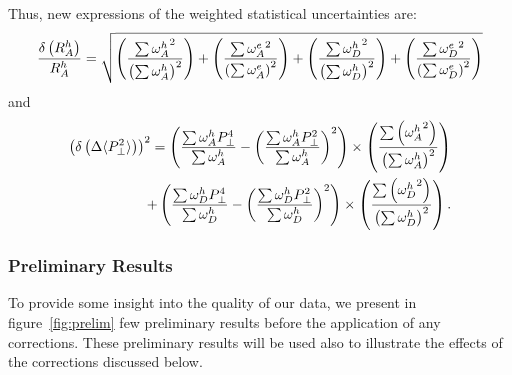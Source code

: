 Thus, new expressions of the weighted statistical uncertainties are: 
\begin{equation}
{\delta \left ( R_A^h \right ) \over R_A^h} = 
      \sqrt{ \left ( {\sum {\omega^h_A}^2 \over \left (\sum \omega^h_A \right )^2} \right ) 
           + \left ( {\sum {\omega^e_A}^2 \over \left (\sum \omega^e_A \right )^2} \right ) 
           + \left ( {\sum {\omega^h_D}^2 \over \left (\sum \omega^h_D \right )^2} \right ) 
           + \left ( {\sum {\omega^e_D}^2 \over \left (\sum \omega^e_D \right )^2} \right ) }
\end{equation}
 and 
\begin{equation}
\begin{split}
\left ( \delta \left ( \Delta \langle P_\perp^2 \rangle \right ) \right )^2 = 
   \left ({{\sum \omega^h_A P_\perp^4 }\over{\sum \omega^h_A}} - \left ({\sum \omega^h_A P_\perp^2 }\over{\sum \omega^h_A}\right )^2 \right ) 
         \times \left ( {\sum \left ( {\omega^h_A}^2 \right ) \over \left ( \sum \omega^h_A \right ) ^2 }\right ) \\
 + \left ({{\sum \omega^h_D P_\perp^4 }\over{\sum \omega^h_D}} - \left ({\sum \omega^h_D P_\perp^2 }\over{\sum \omega^h_D}\right )^2 \right ) 
	 \times \left ( {\sum \left ( {\omega^h_D}^2 \right ) \over \left ( \sum \omega^h_D \right ) ^2 }\right ).
\end{split}
\end{equation}

\subsubsection{Preliminary Results}
\label{prelim}

To provide some insight into the quality of our data, we present in figure~\ref{fig:prelim} few preliminary results before the application of any corrections. These preliminary results will be used also to illustrate the effects of the corrections discussed below.


